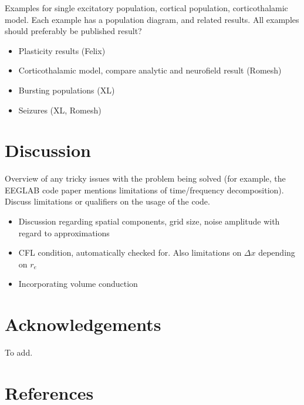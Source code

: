 \documentclass[preprint,review,10pt,authoryear,letterpaper]{elsarticle}
\begin{document}
Examples for single excitatory population, cortical population, corticothalamic model. Each example has a population diagram, and related results. All examples should preferably be published result?

\begin{itemize}
\item Plasticity results (Felix)
\item Corticothalamic model, compare analytic and neurofield result (Romesh)
\item Bursting populations (XL)
\item Seizures (XL, Romesh)
\end{itemize}

\section{Discussion}
\label{sec:discussion}

Overview of any tricky issues with the problem being solved (for example, the EEGLAB code paper mentions limitations of time/frequency decomposition). Discuss limitations or qualifiers on the usage of the code.

\begin{itemize}
\item Discussion regarding spatial components, grid size, noise amplitude with regard to approximations
\item CFL condition, automatically checked for. Also limitations on $\Delta x$ depending on $r_e$
\item Incorporating volume conduction
\end{itemize}

\section{Acknowledgements}
\label{sec:acknowledgements}
To add.

\section{References}


\end{document}
